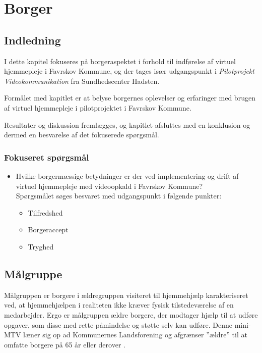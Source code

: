 \chapter{Borger}

\section{Indledning}
I dette kapitel fokuseres på borgeraspektet i forhold til indførelse af virtuel hjemmepleje i Favrskov Kommune, og der tages især udgangspunkt i \textit{Pilotprojekt Videokommunikation} fra Sundhedscenter Hadsten. 

Formålet med kapitlet er at belyse borgernes oplevelser og erfaringer med brugen af virtuel hjemmepleje i pilotprojektet i Favrskov Kommune. 

Resultater og diskussion fremlægges, og kapitlet afsluttes med en konklusion og dermed en besvarelse af det fokuserede spørgsmål.



\subsection{Fokuseret spørgsmål}
\begin{itemize}
	\item Hvilke borgermæssige betydninger er der ved implementering og drift af virtuel hjemmepleje med videoopkald i Favrskov Kommune? \\Spørgsmålet søges besvaret med udgangspunkt i følgende punkter:
	\begin{itemize}
	\item Tilfredshed
	\item Borgeraccept
	\item Tryghed
\end{itemize}
\end{itemize}

\section{Målgruppe}
\label{sec:mgruppe}
Målgruppen er borgere i ældregruppen visiteret til hjemmehjælp karakteriseret ved, at hjemmehjælpen i realiteten ikke kræver fysisk tilstedeværelse af en medarbejder. Ergo er målgruppen ældre borgere, der modtager hjælp til at udføre opgaver, som disse med rette påmindelse og støtte selv kan udføre. Denne mini-MTV læner sig op ad Kommunernes Landsforening og afgrænser ”ældre” til at omfatte borgere på 65 år eller derover \cite{KL}. 

